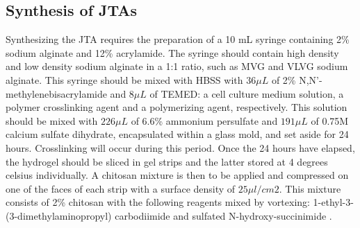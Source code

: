 \subsection{Synthesis of JTAs}
Synthesizing the JTA requires the preparation of a 10 mL syringe containing 2\% sodium alginate and 12\% acrylamide. The syringe should contain high density and low density sodium alginate in a 1:1 ratio, such as MVG and VLVG sodium alginate. This syringe should be mixed with HBSS with $36 \mu L$ of 2\% N,N'-methylenebisacrylamide and $8 \mu L$ of TEMED: a cell culture medium solution, a polymer crosslinking agent and a polymerizing agent, respectively. This solution should be mixed with  $226 \mu L$ of 6.6\% ammonium persulfate and $191 \mu L$ of 0.75M calcium sulfate dihydrate, encapsulated within a glass mold, and set aside for 24 hours. Crosslinking will occur during this period. Once the 24 hours have elapsed, the hydrogel should be sliced in gel strips and the latter stored at 4 degrees celsius individually. A chitosan mixture is then to be applied and compressed on one of the faces of each strip with a surface density of $25 \mu l/cm{2}$. This mixture consists of 2\% chitosan with the following reagents mixed by vortexing: 1-ethyl-3-(3-dimethylaminopropyl) carbodiimide and sulfated N-hydroxy-succinimide \autocite{freedmanEnhancedTendonHealing2022}.